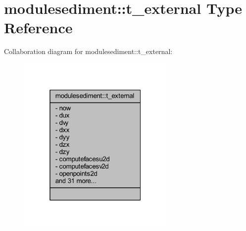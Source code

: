 \hypertarget{structmodulesediment_1_1t__external}{}\section{modulesediment\+:\+:t\+\_\+external Type Reference}
\label{structmodulesediment_1_1t__external}


Collaboration diagram for modulesediment\+:\+:t\+\_\+external\+:\nopagebreak
\begin{figure}[H]
\begin{center}
\leavevmode
\includegraphics[width=217pt]{structmodulesediment_1_1t__external__coll__graph}
\end{center}
\end{figure}
